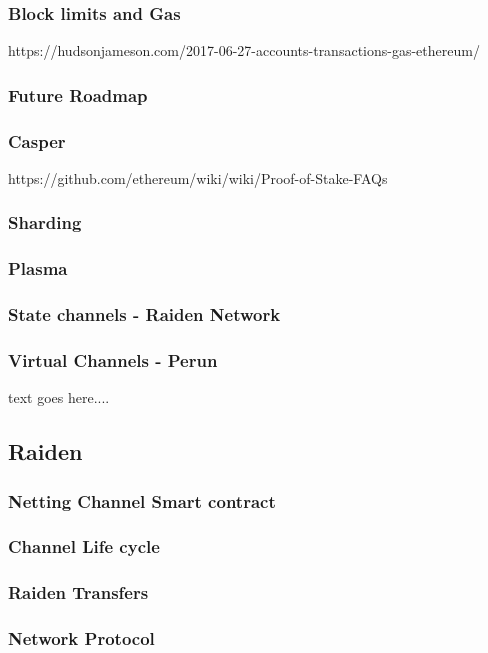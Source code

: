\subsubsection{Block limits and Gas}
https://hudsonjameson.com/2017-06-27-accounts-transactions-gas-ethereum/
\subsubsection{Future Roadmap}
\subsubsection{Casper}
https://github.com/ethereum/wiki/wiki/Proof-of-Stake-FAQs
\subsubsection{Sharding}
\subsubsection{Plasma}
\subsubsection{State channels - Raiden Network}
\subsubsection{Virtual Channels - Perun}
text goes here....



\subsection{Raiden}
\subsubsection{Netting Channel Smart contract}
\subsubsection{Channel Life cycle}
\subsubsection{Raiden Transfers}
\subsubsection{Network Protocol}

